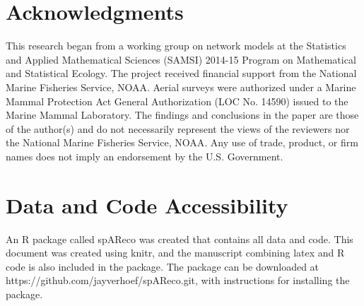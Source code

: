 \documentclass[11pt, titlepage]{article}\usepackage[]{graphicx}\usepackage[]{color}
\begin{document}
\begin{spacing}{1.9}
\begin{flushleft}
\section*{Acknowledgments} 

This research began from a working group on network models at the Statistics and Applied Mathematical Sciences (SAMSI) 2014-15 Program on Mathematical and Statistical Ecology. The project received financial support from the National Marine Fisheries Service, NOAA. Aerial surveys were authorized under a Marine Mammal Protection Act General Authorization (LOC No. 14590) issued to the Marine Mammal Laboratory. The findings and conclusions in the paper are those of the author(s) and do not necessarily represent the views of the reviewers nor the National Marine Fisheries Service, NOAA. Any use of trade, product, or firm names does not imply an endorsement by the U.S. Government. 

\section*{Data and Code Accessibility}

An R package called spAReco was created that contains all data and code. This document was created using knitr, and the manuscript combining latex and R code is also included in the package.  The package can be downloaded at https://github.com/jayverhoef/spAReco.git, with instructions for installing the package.


%


%
%



\end{flushleft}
\end{spacing}
\end{document}
